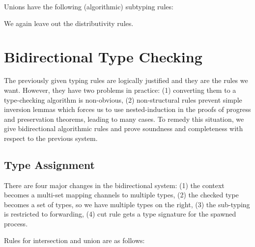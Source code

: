 \documentclass[11pt]{article}
\theoremstyle{plain}
\theoremstyle{definition}
\theoremstyle{remark}
\DeclarePairedDelimiter\parens{(}{)}             %
\newcommand\sub{\le}
\newcommand\intersect{\mathbin{\sqcap}}
\newcommand\union{\mathbin{\sqcup}}
\newcommand\irb[1]{\texttt{#1}}
\newcommand\Right{\irb{R}}
\newcommand\Left{\irb{L}}
\newcommand\Sub[1]{\text{Sub-}#1}
\newcommand{\ctx}{\Psi}
\newcommand\typeBi[4]{#1 \Vdash #2 :: \parens{#3 : #4}}
\newcommand{\typeList}{\alpha}
\begin{document}
Unions have the following (algorithmic) subtyping rules:

We again leave out the distributivity rules.


\section{Bidirectional Type Checking}

The previously given typing rules are logically justified and they are the rules we want. However, they have two problems in practice: (1) converting them to a type-checking algorithm is non-obvious, (2) non-structural rules prevent simple inversion lemmas which forces us to use nested-induction in the proofs of progress and preservation theorems, leading to many cases. To remedy this situation, we give bidirectional algorithmic rules and prove soundness and completeness with respect to the previous system.

\subsection{Type Assignment}

There are four major changes in the bidirectional system: (1) the context becomes a multi-set mapping channels to multiple types, (2) the checked type becomes a set of types, so we have multiple types on the right, (3) the sub-typing is restricted to forwarding, (4) cut rule gets a type signature for the spawned process.

Rules for intersection and union are as follows:

\end{document}
